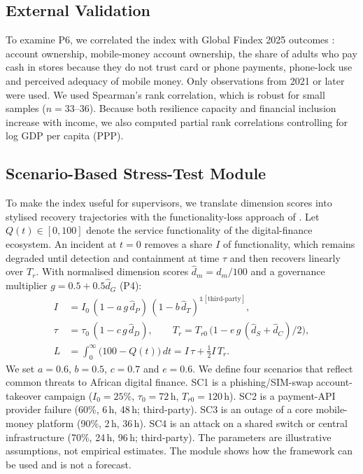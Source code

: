 \documentclass[fintech,article,submit,pdftex,moreauthors]{Definitions/mdpi}
\begin{document}
\subsection{External Validation}\label{sec:valid_m}

To examine P6, we correlated the index with Global Findex 2025 outcomes \citep{WB2025Findex}: account ownership, mobile-money account ownership, the share of adults who pay cash in stores because they do not trust card or phone payments, phone-lock use and perceived adequacy of mobile money. Only observations from 2021 or later were used. We used Spearman's rank correlation, which is robust for small samples ($n=33$--36). Because both resilience capacity and financial inclusion increase with income, we also computed partial rank correlations controlling for log GDP per capita (PPP).

\subsection{Scenario-Based Stress-Test Module}\label{sec:scen_m}

To make the index useful for supervisors, we translate dimension scores into stylised recovery trajectories with the functionality-loss approach of \citet{Bruneau2003}. Let $Q(t)\in[0,100]$ denote the service functionality of the digital-finance ecosystem. An incident at $t=0$ removes a share $I$ of functionality, which remains degraded until detection and containment at time $\tau$ and then recovers linearly over $T_r$. With normalised dimension scores $\hat d_m=d_m/100$ and a governance multiplier $g=0.5+0.5\hat d_G$ (P4):
\begin{align}
 I &= I_0\,(1-a\,g\,\hat d_P)\,(1-b\,\hat d_T)^{\mathbb{1}[\text{third-party}]}, \label{eq:I}\\
 \tau &= \tau_0\,(1-c\,g\,\hat d_D), \qquad
 T_r = T_{r0}\,\big(1-e\,g\,(\hat d_S+\hat d_C)/2\big), \label{eq:tau}\\
 L &= \int_0^{\infty}\!\big(100-Q(t)\big)\,dt = I\,\tau + \tfrac{1}{2} I\, T_r . \label{eq:L}
\end{align}
We set $a=0.6$, $b=0.5$, $c=0.7$ and $e=0.6$. We define four scenarios that reflect common threats to African digital finance. SC1 is a phishing/SIM-swap account-takeover campaign ($I_0=25\%$, $\tau_0=72$\,h, $T_{r0}=120$\,h). SC2 is a payment-API provider failure (60\%, 6\,h, 48\,h; third-party). SC3 is an outage of a core mobile-money platform (90\%, 2\,h, 36\,h). SC4 is an attack on a shared switch or central infrastructure (70\%, 24\,h, 96\,h; third-party). The parameters are illustrative assumptions, not empirical estimates. The module shows how the framework can be used and is not a forecast.
\end{document}
